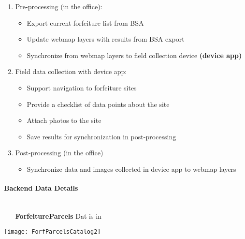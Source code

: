 \documentclass[class=article , crop=false, titlepage, twoside, multi={itemize, figure, verbatim}, float=false]{standalone}
\begin{document}
\begin{enumerate}

\item Pre-processing (in the office):
\begin{itemize}

\item Export current forfeiture list from BSA
\item Update webmap layers with results from BSA export
\item Synchronize from webmap layers to field collection device \textbf{(device app)}
\end{itemize}

\item Field data collection with device app:
\begin{itemize}

\item Support navigation to forfeiture sites
\item Provide a checklist of data points about the site
\item Attach photos to the site
\item Save results for synchronization in post-processing
\end{itemize}

\item Post-processing (in the office)
\begin{itemize}

\item Synchronize data and images collected in device app to webmap layers

\end{itemize}
\end{enumerate}

\paragraph{Backend Data Details\\\\}

\begin{minipage}{0.4\textwidth}
\begin{itemize}
\item[\textbf{ForfeitureParcels}]Dat is in 
\end{itemize}
\end{minipage}%
%
\begin{minipage}{0.4\textwidth}
\begin{center}
    \texttt{[image: ForfParcelsCatalog2]}
    \label{img:g}
\end{center}
\end{minipage}
\end{document}

